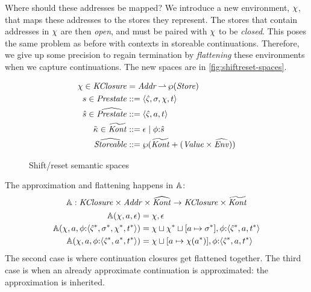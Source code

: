 Where should these addresses be mapped?
%
We introduce a new environment, $\chi$, that maps these addresses to the stores they represent.
%
The stores that contain addresses in $\chi$ are then \emph{open}, and must be paired with $\chi$ to be \emph{closed}.
%
This poses the same problem as before with contexts in storeable continuations.
%
Therefore, we give up some precision to regain termination by \emph{flattening} these environments when we capture continuations.
%
The new spaces are in \autoref{fig:shiftreset-spaces}.
%
\begin{figure}
  \centering
  \begin{align*}
    \chi \in \mathit{KClosure} &= \mathit{Addr} \operatorname*{\rightharpoonup} \wp(\mathit{Store}) \\
    s \in \mathit{Prestate} &::= \langle \hat\varsigma,\sigma,\chi,t \rangle \\
    \hat{s} \in \widehat{\mathit{Prestate}} &::= \langle \hat\varsigma,a,t \rangle \\
    \tilde{\kappa} \in \widetilde{\mathit{Kont}} &::= \epsilon \mathrel{\mid} \phi{\tt :} \hat{s} \\
    \widehat{\mathit{Storeable}} &::= \wp(\widetilde{\mathit{Kont}} + (\mathit{Value} \times \widehat{\mathit{Env}})) \\
  \end{align*}
  \caption{Shift/reset semantic spaces}
  \label{fig:shiftreset-spaces}
\end{figure}
%
The approximation and flattening happens in ${\mathbb A}$:
\begin{equation*}
  {\mathbb A} : \mathit{KClosure} \times \mathit{Addr} \times \widehat{\mathit{Kont}} \to \mathit{KClosure} \times \widetilde{\mathit{Kont}}
\end{equation*}
\begin{align*}
  {\mathbb A}(\chi,a,\epsilon) &= \chi,\epsilon \\
  {\mathbb A}(\chi,a,\phi{\tt :} \langle \hat\varsigma^*,\sigma^*,\chi^*,t^* \rangle) &= \chi\sqcup\chi^*\sqcup[a \mapsto \sigma^*],\phi{\tt :} \langle \hat\varsigma^*,a,t^* \rangle \\
  {\mathbb A}(\chi,a,\phi{\tt :} \langle \hat\varsigma^*,a^*,t^* \rangle) &= \chi\sqcup[a \mapsto \chi(a^*)],\phi{\tt :} \langle \hat\varsigma^*,a,t^* \rangle
\end{align*}
The second case is where continuation closures get flattened together.
%
The third case is when an already approximate continuation is approximated: the approximation is inherited.

